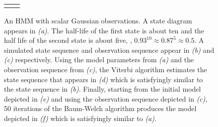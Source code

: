 \begin{figure}[htbp]
{\begin{tabular}[H]{cc}
\begin{picture}
      \end{picture}%
      {\def\prba{$0.92$}%
        \def\prbb{$0.12$}%
        \def\prbc{$0.08$}%
        \def\prbd{$0.88$}%
        \def\lbla{\parbox[t]{1.8in}{$\mu=-0.74$\\$\sigma^2=1.09$}}%
        \def\lblb{\parbox[t]{1.8in}{$\mu=1.17$\\$\sigma^2=1.27$}}%
        
      }
      \end{tabular}}
  \caption[An HMM with scalar Gaussian observations.]%
  {An HMM with scalar Gaussian observations.  A state diagram appears in
    \emph{(a)}.  The half-life of the first state is about ten and the half
    life of the second state is about five, \ie, $0.93^{10} \approx
    0.87^5 \approx 0.5$.  A simulated state sequence and observation
    sequence appear in \emph{(b)} and \emph{(c)} respectively.  Using the model
    parameters from \emph{(a)} and the observation sequence from \emph{(c)}, the
    Viterbi algorithm estimates the state sequence that appears in \emph{(d)}
    which is satisfyingly similar to the state sequence in \emph{(b)}.
    Finally, starting from the initial model depicted in \emph{(e)} and using
    the observation sequence depicted in \emph{(c)}, 50 iterations of the
    Baum-Welch algorithm produces the model depicted in \emph{(f)} which is
    satisfyingly similar to \emph{(a)}.}
  \label{fig:ScalarGaussian}
\end{figure}


